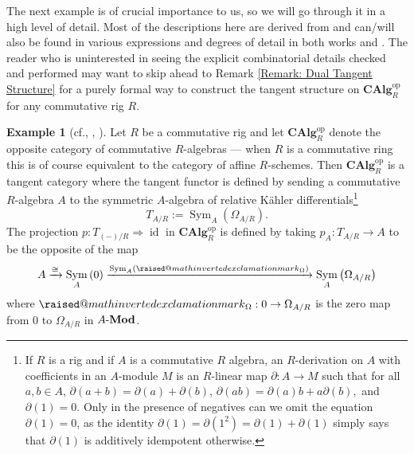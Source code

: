 \documentclass{amsart}
\makeatletter
\theoremstyle{definition}
\newtheorem{example}[equation]{Example}
\newcommand{\raisedmathinvertedexclamationmark}{%
	\mathord{\mathpalette\raised@mathinvertedexclamationmark\relax}%
}
\newcommand{\raised@mathinvertedexclamationmark}[2]{%
	\raisebox{\depth}{$\m@th#1\mathinvertedexclamationmark$}%
}
\newcommand{\gnab}{\raisedmathinvertedexclamationmark}
\DeclareMathOperator{\sym}{Sym}
\DeclareMathOperator{\id}{id}
\DeclareMathOperator{\op}{op}
\newcommand{\CAlg}[1]{\mathbf{CAlg}_{#1}}
\newcommand{\Sym}[1]{\sym_{#1}}
\newcommand{\Mod}[1]{{#1}\textnormal{-}\mathbf{Mod}}
\newcommand{\Kah}[2]{\Omega_{{#1}/{#2}}}
\numberwithin{equation}{subsection}
\makeatother
\begin{document}
The next example is of crucial importance to us,  so we will go through it in a high level of detail. Most of the descriptions here are derived from \cite{GeoffJSDiffBunComAlg} and can/will also be found in various expressions and degrees of detail in both works \cite{RobinMePartialMapRigs} and \cite{JSMeMapFlavoursInTanCats}. The reader who is uninterested in seeing the explicit combinatorial details checked and performed may want to skip ahead to Remark \ref{Remark: Dual Tangent Structure} for a purely formal way to construct the tangent structure on $\CAlg{R}^{\op}$ for any commutative rig $R$.

\begin{example}[{cf.\@ \cite[Example 4.2]{GeoffJSDiffBunComAlg}, \cite{RobinMePartialMapRigs}, \cite{JSMeMapFlavoursInTanCats}}]\label{Example: The tangent category of affine R schemes}
	Let $R$ be a commutative rig and let $\CAlg{R}^{\op}$ denote the opposite category of commutative $R$-algebras --- when $R$ is a commutative ring this is of course equivalent to the category of affine $R$-schemes. Then $\CAlg{R}^{\op}$ is a tangent category where the tangent functor is defined by sending a commutative $R$-algebra $A$ to the symmetric $A$-algebra of relative K{\"a}hler differentials\footnote{If $R$ is a rig and if $A$ is a commutative $R$ algebra, an $R$-derivation on $A$ with coefficients in an $A$-module $M$ is an $R$-linear map $\partial:A \to M$ such that for all $a, b \in A$, $\partial(a+b) = \partial(a)+\partial(b)$, $\partial(ab) = \partial(a)b + a\partial(b),$ and $\partial(1) = 0$. Only in the presence of negatives can we omit the equation $\partial(1) = 0$, as the identity $\partial(1) = \partial(1^2) = \partial(1)+\partial(1)$ simply says that $\partial(1)$ is additively idempotent otherwise.} 
	\begin{equation}\label{Eqn: Section Tangent: Tangent Structure of Affine Tangent Functor}
	T_{A/R} := \Sym{A}\left(\Kah{A}{R}\right).
	\end{equation}
	The projection $p:T_{(-)/R} \Rightarrow \id$ in $\CAlg{R}^{\op}$ is defined by taking $p_A:T_{A/R} \to A$ to be the opposite of the map
	\begin{equation}\label{Eqn: Section Tangent: Tangent Structure of Affine Projection Map}
	A \xrightarrow{\cong} \Sym{A}\left(0\right) \xrightarrow{\Sym{A}(\gnab_{\Omega})} \Sym{A}\left(\Kah{A}{R}\right)
	\end{equation}
	where $\gnab_{\Omega}:0 \to \Kah{A}{R}$ is the zero map from $0$ to $\Kah{A}{R}$ in $\Mod{A}$. 
	

\end{example}
\end{document}
